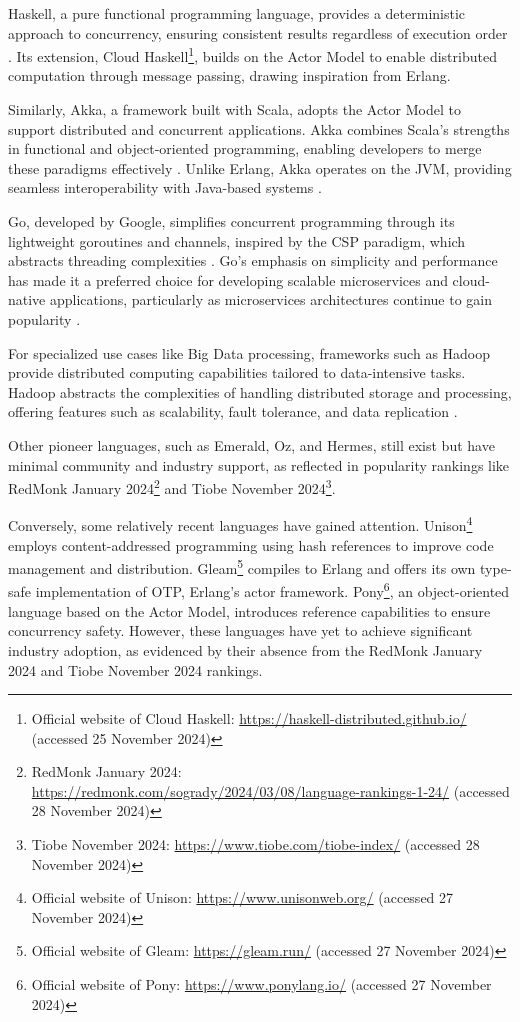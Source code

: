 Haskell, a pure functional programming language, provides a deterministic approach to concurrency, ensuring consistent results regardless of execution order \cite{Valkov2018}. Its extension, Cloud Haskell\footnote{Official website of Cloud Haskell: \url{https://haskell-distributed.github.io/} (accessed 25 November 2024)}, builds on the Actor Model to enable distributed computation through message passing, drawing inspiration from Erlang.

Similarly, Akka, a framework built with Scala, adopts the Actor Model to support distributed and concurrent applications. Akka combines Scala’s strengths in functional and object-oriented programming, enabling developers to merge these paradigms effectively \cite{Valkov2018}. Unlike Erlang, Akka operates on the \gls{JVM}, providing seamless interoperability with Java-based systems \cite{Abraham2023}.

Go, developed by Google, simplifies concurrent programming through its lightweight goroutines and channels, inspired by the \gls{CSP} paradigm, which abstracts threading complexities \cite{Brolos2021}. Go’s emphasis on simplicity and performance has made it a preferred choice for developing scalable microservices and cloud-native applications, particularly as microservices architectures continue to gain popularity \cite{go-docs}.

For specialized use cases like Big Data processing, frameworks such as Hadoop provide distributed computing capabilities tailored to data-intensive tasks. Hadoop abstracts the complexities of handling distributed storage and processing, offering features such as scalability, fault tolerance, and data replication \cite{Polato2014}.

Other pioneer languages, such as Emerald, Oz, and Hermes, still exist but have minimal community and industry support, as reflected in popularity rankings like RedMonk January 2024\footnote{RedMonk January 2024: \url{https://redmonk.com/sogrady/2024/03/08/language-rankings-1-24/} (accessed 28 November 2024)} and Tiobe November 2024\footnote{Tiobe November 2024: \url{https://www.tiobe.com/tiobe-index/} (accessed 28 November 2024)}.

Conversely, some relatively recent languages have gained attention. Unison\footnote{Official website of Unison: \url{https://www.unisonweb.org/} (accessed 27 November 2024)} employs content-addressed programming using hash references to improve code management and distribution. Gleam\footnote{Official website of Gleam: \url{https://gleam.run/} (accessed 27 November 2024)} compiles to Erlang and offers its own type-safe implementation of \gls{OTP}, Erlang’s actor framework. Pony\footnote{Official website of Pony: \url{https://www.ponylang.io/} (accessed 27 November 2024)}, an object-oriented language based on the Actor Model, introduces reference capabilities to ensure concurrency safety. However, these languages have yet to achieve significant industry adoption, as evidenced by their absence from the RedMonk January 2024 and Tiobe November 2024 rankings.

